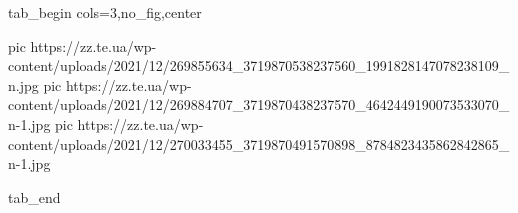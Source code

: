  
 
 
 
 


\ifcmt
  tab_begin cols=3,no_fig,center

     pic https://zz.te.ua/wp-content/uploads/2021/12/269855634_3719870538237560_1991828147078238109_n.jpg
		 pic https://zz.te.ua/wp-content/uploads/2021/12/269884707_3719870438237570_4642449190073533070_n-1.jpg
		 pic https://zz.te.ua/wp-content/uploads/2021/12/270033455_3719870491570898_8784823435862842865_n-1.jpg

  tab_end
\fi
